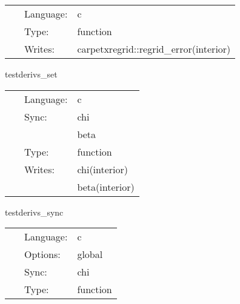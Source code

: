 \hspace{5mm}

 \begin{tabular*}{160mm}{cll} 
~ & Language:  & c \\ 
~ & Type:  & function \\ 
~ & Writes:  & carpetxregrid::regrid\_error(interior) \\ 
\end{tabular*} 


\vspace{5mm}


\hspace{5mm} testderivs\_set 

\hspace{5mm}{\it set up test data } 


\hspace{5mm}

 \begin{tabular*}{160mm}{cll} 
~ & Language:  & c \\ 
~ & Sync:  & chi \\ 
~& ~ &beta\\ 
~ & Type:  & function \\ 
~ & Writes:  & chi(interior) \\ 
~& ~ &beta(interior)\\ 
\end{tabular*} 


\vspace{5mm}


\hspace{5mm} testderivs\_sync 

\hspace{5mm}{\it synchronize } 


\hspace{5mm}

 \begin{tabular*}{160mm}{cll} 
~ & Language:  & c \\ 
~ & Options:  & global \\ 
~ & Sync:  & chi \\ 
~ & Type:  & function \\ 
\end{tabular*} 


\vspace{5mm}


